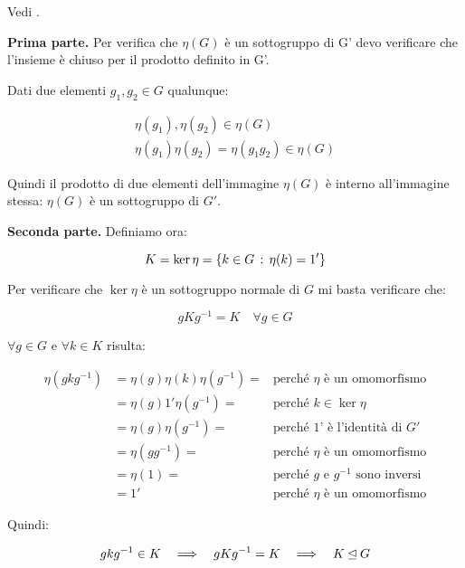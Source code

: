 \begin{dimostrazione}
	Vedi \cite[pagg. 61 e 62]{jacobson}.
	
	\textbf{Prima parte. }	
	Per verifica che $\eta(G)$ è un sottogruppo di G' devo verificare che l'insieme è chiuso per il prodotto definito in G'.
	
	Dati due elementi $g_1, g_2 \in G$ qualunque:
	
	\begin{gather}
		\eta(g_1), \eta(g_2) \in \eta(G) \\
		\eta(g_1)\eta(g_2) = \eta(g_1g_2) \in \eta(G)
	\end{gather}

	Quindi il prodotto di due elementi dell'immagine $\eta(G)$ è interno all'immagine stessa: $\eta(G)$ è un sottogruppo di $G'$.
	
	\textbf{Seconda parte.}
	Definiamo ora:
	
	\begin{equation}
		K = \ker \eta = \{k \in G \,:\, \eta(k) = 1'\}
	\end{equation}

	Per verificare che $\ker \eta$ è un sottogruppo normale di $G$ mi basta verificare che:
	
	\begin{equation}
		gKg^{-1} = K \quad\forall g \in G
	\end{equation}
		
	$\forall g \in G$ e $\forall k \in K$ risulta:
	
	\begin{align}
		\eta(gkg^{-1}) &= \eta(g)\eta(k)\eta(g^{-1}) = &\text{perché $\eta$ è un omomorfismo} \\
		&= \eta(g)1'\eta(g^{-1}) = &\text{perché $k \in \ker \eta$} \\
		&= \eta(g)\eta(g^{-1}) = &\text{perché 1' è l'identità di $G'$} \\
		&= \eta(gg^{-1}) = &\text{perché $\eta$ è un omomorfismo} \\
		&= \eta(1) = &\text{perché $g$ e $g^{-1}$ sono inversi} \\
		&= 1' &\text{perché $\eta$ è un omomorfismo}
	\end{align}

	Quindi:
	
	\begin{equation}
		gkg^{-1} \in K \quad\Longrightarrow\quad gKg^{-1} = K \quad\Longrightarrow\quad K \unlhd G
	\end{equation}


\end{dimostrazione}
